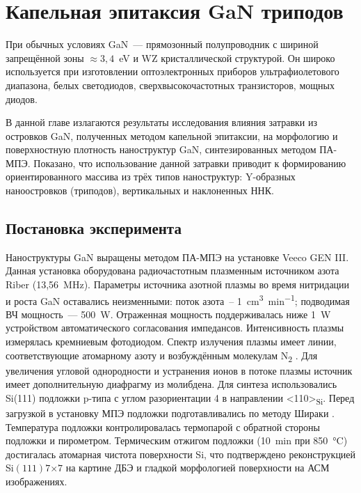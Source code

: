 \chapter{Капельная эпитаксия GaN триподов}\label{ch:ch3}

При обычных условиях GaN~--- прямозонный полупроводник с шириной запрещённой
зоны \(\approx 3,4\)~\si{\electronvolt} и WZ кристаллической структурой. Он
широко используется при изготовлении оптоэлектронных приборов ультрафиолетового
диапазона, белых светодиодов, сверхвысокочастотных транзисторов, мощных диодов.

В данной главе излагаются результаты исследования влияния затравки из островков
GaN, полученных методом капельной эпитаксии, на морфологию и поверхностную
плотность наноструктур GaN, синтезированных методом ПА-МПЭ. Показано, что
использование данной затравки \cite{Debnath2009, Yu2014} приводит к
формированию ориентированного массива из трёх типов наноструктур: Y-образных
наноостровков (триподов), вертикальных и наклоненных ННК.

\section{Постановка эксперимента}\label{sec:ch3/sec1}

Наноструктуры GaN выращены методом ПА-МПЭ на установке Veeco GEN III. Данная
установка оборудована радиочастотным плазменным источником азота Riber
(13,56~\si{\mega\hertz}). Параметры источника азотной плазмы во время
нитридации и роста GaN оставались неизменными: поток азота~--
1~\si{\centi\meter^3\per\minute}; подводимая ВЧ мощность~--- 500~\si{\watt}.
Отраженная мощность поддерживалась ниже 1~\si{\watt} устройством
автоматического согласования импедансов. Интенсивность плазмы измерялась
кремниевым фотодиодом. Спектр излучения плазмы имеет линии, соответствующие
атомарному азоту и возбуждённым молекулам N\textsubscript{2}
\cite{Debnath2016}. Для увеличения угловой однородности и устранения ионов в
потоке плазмы источник имеет дополнительную диафрагму из молибдена. Для синтеза
использовались Si(111) подложки p-типа с углом разориентации 4{\textdegree} в
направлении <110>\textsubscript{Si}. Перед загрузкой в установку МПЭ подложки
подготавливались по методу Шираки \cite{Ishizaka2019}. Температура подложки
контролировалась термопарой с обратной стороны подложки и пирометром.
Термическим отжигом подложки (10~\si{\minute} при 850~\si{\degreeCelsius})
достигалась атомарная чистота поверхности Si, что подтверждено реконструкцией
Si\((111)7\)\(\times\)\(7\) на картине ДБЭ и гладкой морфологией поверхности на
АСМ изображениях.

